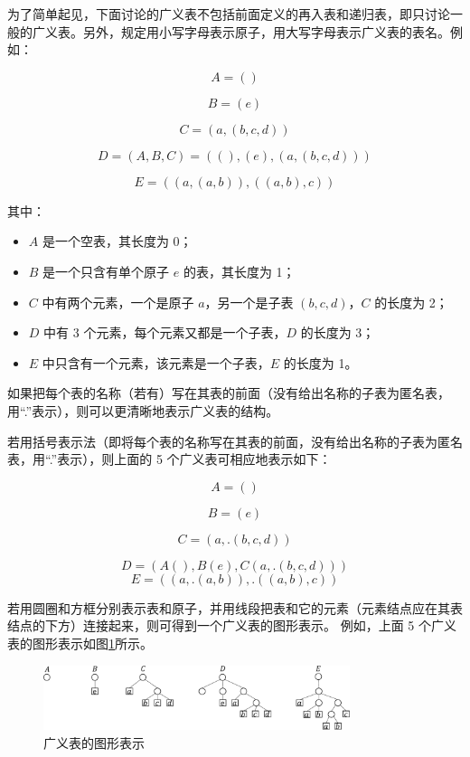 \documentclass[lang=cn,newtx,10pt,scheme=chinese]{../elegantbook}
\begin{document}
为了简单起见，下面讨论的广义表不包括前面定义的再入表和递归表，即只讨论一般的广义表。另外，规定用小写字母表示原子，用大写字母表示广义表的表名。例如：

\[
A = ()
\]

\[
 B = (e)
\]

\[
C = (a, (b, c, d))
\]

\[
D = (A, B, C) = ((), (e), (a, (b, c, d)))
\]

\[
E = ((a, (a, b)), ((a, b), c))
\]

其中：
\begin{itemize}
  \item $A$ 是一个空表，其长度为 0；
  \item $B$ 是一个只含有单个原子 $e$ 的表，其长度为 1；
  \item $C$ 中有两个元素，一个是原子 $a$，另一个是子表 $(b, c, d)$，$C$ 的长度为 2；
  \item $D$ 中有 3 个元素，每个元素又都是一个子表，$D$ 的长度为 3；
  \item $E$ 中只含有一个元素，该元素是一个子表，$E$ 的长度为 1。
\end{itemize}

如果把每个表的名称（若有）写在其表的前面（没有给出名称的子表为匿名表，用“.”表示），则可以更清晰地表示广义表的结构。

若用括号表示法（即将每个表的名称写在其表的前面，没有给出名称的子表为匿名表，用“.”表示），则上面的 5 个广义表可相应地表示如下：

\[
A = ()
\]

\[
  B = (e)
\]

\[
  C = (a, .(b, c, d))
\]

\[
D = (A(), B(e), C(a, .(b, c, d)))
\]
\[
E = ((a, .(a, b)), .((a, b), c))
\]

若用圆圈和方框分别表示表和原子，并用线段把表和它的元素（元素结点应在其表结点的下方）连接起来，则可得到一个广义表的图形表示。
例如，上面 5 个广义表的图形表示如图\ref{fig:generalized_table}所示。

\begin{figure}[h]
  \centering
  \includegraphics[width=0.8\textwidth]{./figure/pdf/cropped/GLGraph.pdf}
  \caption{广义表的图形表示}
  \label{fig:generalized_table}
\end{figure}
\end{document}

